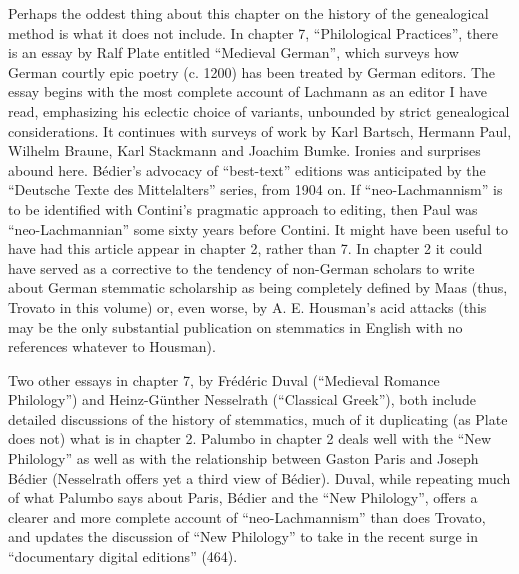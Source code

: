 \documentclass{article}
\begin{document}
Perhaps the oddest thing about this chapter on the history of
the genealogical method is what it does not include. In chapter 7,
``Philological Practices'', there is an essay by Ralf Plate entitled
``Medieval German'', which surveys how German courtly epic poetry (c.
1200) has been treated by German editors. The essay begins with the most
complete account of Lachmann as an editor I have read, emphasizing his
eclectic choice of variants, unbounded by strict genealogical
considerations. It continues with surveys of work by Karl Bartsch,
Hermann Paul, Wilhelm Braune, Karl Stackmann and Joachim Bumke. Ironies
and surprises abound here. Bédier's advocacy of ``best-text'' editions
was anticipated by the ``Deutsche Texte des Mittelalters'' series, from
1904 on. If ``neo-Lachmannism'' is to be identified with Contini's
pragmatic approach to editing, then Paul was ``neo-Lachmannian'' some
sixty years before Contini. It might have been useful to have had this
article appear in chapter 2, rather than 7. In chapter 2 it could have
served as a corrective to the tendency of non-German scholars to write
about German stemmatic scholarship as being completely defined by Maas
(thus, Trovato in this volume) or, even worse, by A. E. Housman's acid
attacks (this may be the only substantial publication on stemmatics in
English with no references whatever to Housman).

Two other essays in chapter 7, by Frédéric Duval (``Medieval
Romance Philology'') and Heinz-Günther Nesselrath (``Classical Greek''),
both include detailed discussions of the history of stemmatics, much of
it duplicating (as Plate does not) what is in chapter 2. Palumbo in
chapter 2 deals well with the ``New Philology'' as well as with the
relationship between Gaston Paris and Joseph Bédier (Nesselrath offers
yet a third view of Bédier). Duval, while repeating much of what Palumbo
says about Paris, Bédier and the ``New Philology'', offers a clearer and
more complete account of ``neo-Lachmannism'' than does Trovato, and
updates the discussion of ``New Philology'' to take in the recent surge
in ``documentary digital editions'' (464).
\end{document}
